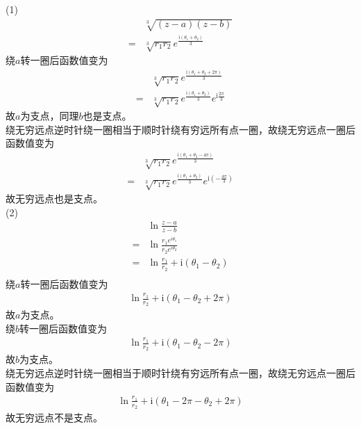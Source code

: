 \documentclass{phyasgn}
\renewcommand{\i}{\mathrm{i}}
\begin{document}
\begin{sol}[8]
    (1)$$\begin{aligned}
        &\sqrt[3]{(z-a)(z-b)}\\
        =&\sqrt[3]{r_1r_2}e^{\frac{\i (\theta_1+\theta_2)}{3}}
    \end{aligned}$$
    绕$a$转一圈后函数值变为
    $$\begin{aligned}
        &\sqrt[3]{r_1r_2}e^{\frac{\i (\theta_1+\theta_2+2\pi)}{3}}\\
        =&\sqrt[3]{r_1r_2}e^{\frac{\i (\theta_1+\theta_2)}{3}}e^{\i\frac{2\pi}{3}}
    \end{aligned}$$
    故$a$为支点，同理$b$也是支点。\\
    绕无穷远点逆时针绕一圈相当于顺时针绕有穷远所有点一圈，故绕无穷远点一圈后函数值变为
    $$\begin{aligned}
        &\sqrt[3]{r_1r_2}e^{\frac{\i (\theta_1+\theta_2-4\pi)}{3}}\\
        =&\sqrt[3]{r_1r_2}e^{\frac{\i (\theta_1+\theta_2)}{3}}e^{\i(-\frac{4\pi}{3})}
    \end{aligned}$$
    故无穷远点也是支点。\\
    (2)$$\begin{aligned}
        &\ln\frac{z-a}{z-b}\\
        =&\ln\frac{r_1e^{i\theta_1}}{r_2e^{i\theta_2}}\\
        =&\ln\frac{r_1}{r_2}+\i(\theta_1-\theta_2)\\
    \end{aligned}$$
    绕$a$转一圈后函数值变为
    $$\begin{aligned}
        \ln\frac{r_1}{r_2}+\i(\theta_1-\theta_2+2\pi)
    \end{aligned}$$
    故$a$为支点。\\
    绕$b$转一圈后函数值变为
    $$\begin{aligned}
        \ln\frac{r_1}{r_2}+\i(\theta_1-\theta_2-2\pi)
    \end{aligned}$$
    故$b$为支点。\\
    绕无穷远点逆时针绕一圈相当于顺时针绕有穷远所有点一圈，故绕无穷远点一圈后函数值变为
    $$\begin{aligned}
        \ln\frac{r_1}{r_2}+\i(\theta_1-2\pi-\theta_2+2\pi)
    \end{aligned}$$
    故无穷远点不是支点。

\end{sol}\par
\end{document}
